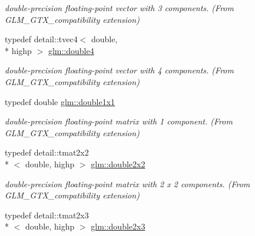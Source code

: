 \begin{DoxyCompactItemize}
\begin{DoxyCompactList}\small\item\em double-\/precision floating-\/point vector with 3 components. (From G\-L\-M\-\_\-\-G\-T\-X\-\_\-compatibility extension) \end{DoxyCompactList}\item 
\hypertarget{group__gtx__compatibility_ga1edf736b418528a2fc87d826f7697b9d}{typedef detail\-::tvec4$<$ double, \\*
highp $>$ \hyperlink{group__gtx__compatibility_ga1edf736b418528a2fc87d826f7697b9d}{glm\-::double4}}\label{group__gtx__compatibility_ga1edf736b418528a2fc87d826f7697b9d}

\begin{DoxyCompactList}\small\item\em double-\/precision floating-\/point vector with 4 components. (From G\-L\-M\-\_\-\-G\-T\-X\-\_\-compatibility extension) \end{DoxyCompactList}\item 
\hypertarget{group__gtx__compatibility_ga1c87d3042377335eb050a20ab0ec148a}{typedef double \hyperlink{group__gtx__compatibility_ga1c87d3042377335eb050a20ab0ec148a}{glm\-::double1x1}}\label{group__gtx__compatibility_ga1c87d3042377335eb050a20ab0ec148a}

\begin{DoxyCompactList}\small\item\em double-\/precision floating-\/point matrix with 1 component. (From G\-L\-M\-\_\-\-G\-T\-X\-\_\-compatibility extension) \end{DoxyCompactList}\item 
\hypertarget{group__gtx__compatibility_ga75cfac00b48c51f4b677151f789b8547}{typedef detail\-::tmat2x2\\*
$<$ double, highp $>$ \hyperlink{group__gtx__compatibility_ga75cfac00b48c51f4b677151f789b8547}{glm\-::double2x2}}\label{group__gtx__compatibility_ga75cfac00b48c51f4b677151f789b8547}

\begin{DoxyCompactList}\small\item\em double-\/precision floating-\/point matrix with 2 x 2 components. (From G\-L\-M\-\_\-\-G\-T\-X\-\_\-compatibility extension) \end{DoxyCompactList}\item 
\hypertarget{group__gtx__compatibility_gac267cd849a60e6e96350aa5fd665d5ef}{typedef detail\-::tmat2x3\\*
$<$ double, highp $>$ \hyperlink{group__gtx__compatibility_gac267cd849a60e6e96350aa5fd665d5ef}{glm\-::double2x3}}\label{group__gtx__compatibility_gac267cd849a60e6e96350aa5fd665d5ef}


\end{DoxyCompactItemize}
